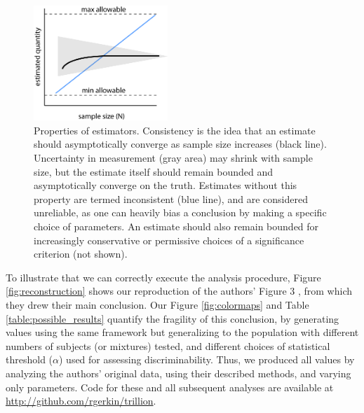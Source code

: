\documentclass[letterpaper,twocolumn,10pt]{article}
\begin{document}
\begin{figure}
    \includegraphics[width=0.45\textwidth]{figures/Fig1_StatPathology}
    \caption{
Properties of estimators. 
Consistency is the idea that an estimate should asymptotically converge 
as sample size increases (black line). 
Uncertainty in measurement (gray area) may shrink with sample size, 
but the estimate itself should remain bounded and asymptotically converge on the truth. 
Estimates without this property are termed inconsistent (blue line), and are considered unreliable, as one can heavily bias a conclusion by making a specific choice of parameters. An estimate should also remain bounded for increasingly conservative or permissive choices of a significance criterion (not shown). 
}
    \label{fig:statpathology}
\end{figure}


To illustrate that we can correctly execute the analysis procedure, 
Figure \ref{fig:reconstruction} shows our reproduction of the authors' Figure 3 \cite{bushdid_humans_2014}, 
from which they drew their main conclusion. Our Figure \ref{fig:colormaps} and Table \ref{table:possible_results} quantify the fragility of this conclusion, 
by generating values using the same framework but generalizing to the population with different numbers of subjects (or mixtures) tested, 
and different choices of statistical threshold ($\alpha$) used for assessing discriminability.  
Thus, we produced all values by analyzing the authors' original data, using their described methods, and varying only parameters. 
Code for these and all subsequent analyses are available at \url{http://github.com/rgerkin/trillion}.  
\end{document}
